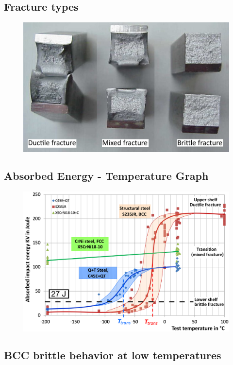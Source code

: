 \documentclass{article}
\begin{document}
\newpage
\subsection{Fracture types}
\begin{figure}[ht!]
  \centering
  \includegraphics[width=.6\textwidth]{media/fracture_surfaces.png}
\end{figure}

\subsection{Absorbed Energy - Temperature Graph}
\begin{figure}[ht!]
  \centering
  \includegraphics[width=\textwidth]{media/energy_temperature_impact_graph.png}
\end{figure}

\subsection{BCC brittle behavior at low temperatures}
\end{document}
